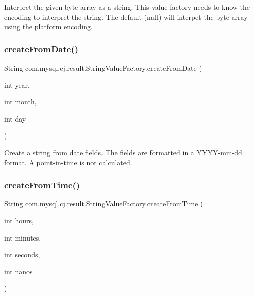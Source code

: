 Interpret the given byte array as a string. This value factory needs to know the encoding to interpret the string. The default (null) will interpet the byte array using the platform encoding. \mbox{\label{classcom_1_1mysql_1_1cj_1_1result_1_1_string_value_factory_a845e3704aa7f1a243b1fca5975dff12a}} 
\subsubsection{\texorpdfstring{create\+From\+Date()}{createFromDate()}}
{\footnotesize\ttfamily String com.\+mysql.\+cj.\+result.\+String\+Value\+Factory.\+create\+From\+Date (\begin{DoxyParamCaption}\item[{int}]{year,  }\item[{int}]{month,  }\item[{int}]{day }\end{DoxyParamCaption})}

Create a string from date fields. The fields are formatted in a Y\+Y\+Y\+Y-\/mm-\/dd format. A point-\/in-\/time is not calculated. \mbox{\label{classcom_1_1mysql_1_1cj_1_1result_1_1_string_value_factory_a403e61bfaa13268e2eb0a15ff92e0aea}} 
\subsubsection{\texorpdfstring{create\+From\+Time()}{createFromTime()}}
{\footnotesize\ttfamily String com.\+mysql.\+cj.\+result.\+String\+Value\+Factory.\+create\+From\+Time (\begin{DoxyParamCaption}\item[{int}]{hours,  }\item[{int}]{minutes,  }\item[{int}]{seconds,  }\item[{int}]{nanos }\end{DoxyParamCaption})}

